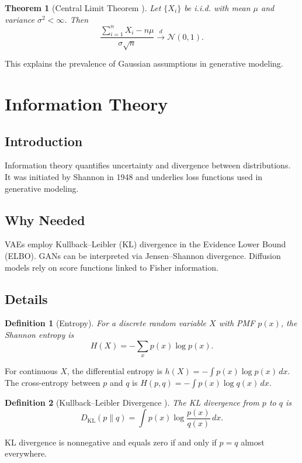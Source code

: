 \documentclass[11pt]{book}
\newtheorem{theorem}{Theorem}[chapter]
\newtheorem{definition}{Definition}[chapter]
\begin{document}
\begin{theorem}[Central Limit Theorem \cite{laplace1812,lyapunov1901}]
Let $\{X_i\}$ be i.i.d. with mean $\mu$ and variance $\sigma^2<\infty$. Then
\begin{equation}
\frac{\sum_{i=1}^n X_i - n\mu}{\sigma\sqrt{n}} \xrightarrow{d} \mathcal{N}(0,1).
\end{equation}
\end{theorem}
This explains the prevalence of Gaussian assumptions in generative modeling.

\section{Information Theory}
\subsection{Introduction}
Information theory quantifies uncertainty and divergence between distributions. It was initiated by Shannon in 1948 and underlies loss functions used in generative modeling.

\subsection{Why Needed}
VAEs employ Kullback--Leibler (KL) divergence in the Evidence Lower Bound (ELBO). GANs can be interpreted via Jensen--Shannon divergence. Diffusion models rely on score functions linked to Fisher information.

\subsection{Details}
\begin{definition}[Entropy]
For a discrete random variable $X$ with PMF $p(x)$, the Shannon entropy is
\begin{equation}
H(X) = -\sum_x p(x)\log p(x).
\end{equation}
\end{definition}

For continuous $X$, the differential entropy is $h(X)=-\int p(x)\log p(x)\,dx$. The cross-entropy between $p$ and $q$ is $H(p,q)=-\int p(x)\log q(x)\,dx$.

\begin{definition}[Kullback--Leibler Divergence \cite{kullback1951}]
The KL divergence from $p$ to $q$ is
\begin{equation}
D_{\mathrm{KL}}(p\|q) = \int p(x) \log \frac{p(x)}{q(x)}\, dx.
\end{equation}
\end{definition}
KL divergence is nonnegative and equals zero if and only if $p=q$ almost everywhere.
\end{document}
